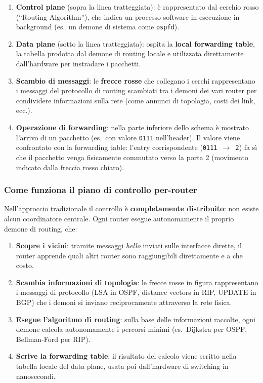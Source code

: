 \documentclass[a4paper,12pt]{report}
\begin{document}
\begin{enumerate}
    \item \textbf{Control plane} (sopra la linea tratteggiata): è rappresentato dal cerchio rosso (``Routing Algorithm''), che indica un processo software in esecuzione in background (es.\ un demone di sistema come \texttt{ospfd}).
    \item \textbf{Data plane} (sotto la linea tratteggiata): ospita la \textbf{local forwarding table}, la tabella prodotta dal demone di routing locale e utilizzata direttamente dall'hardware per instradare i pacchetti.
    \item \textbf{Scambio di messaggi}: le \textbf{frecce rosse} che collegano i cerchi rappresentano i messaggi del protocollo di routing scambiati tra i demoni dei vari router per condividere informazioni sulla rete (come annunci di topologia, costi dei link, ecc.).
    \item \textbf{Operazione di forwarding}: nella parte inferiore dello schema è mostrato l'arrivo di un pacchetto (es.\ con valore \texttt{0111} nell'header). Il valore viene confrontato con la forwarding table: l'entry corrispondente (\texttt{0111 $\to$ 2}) fa sì che il pacchetto venga fisicamente commutato verso la porta 2 (movimento indicato dalla freccia rosso chiaro).
\end{enumerate}

\newpage
\subsubsection*{Come funziona il piano di controllo per-router}

Nell'approccio tradizionale il controllo è \textbf{completamente distribuito}:
non esiste alcun coordinatore centrale. Ogni router esegue autonomamente il
proprio demone di routing, che:

\begin{enumerate}
    \item \textbf{Scopre i vicini}: tramite messaggi \textit{hello} inviati
          sulle interfacce dirette, il router apprende quali altri router
          sono raggiungibili direttamente e a che costo.
    \item \textbf{Scambia informazioni di topologia}: le frecce rosse in
          figura rappresentano i messaggi di protocollo (LSA in OSPF,
          distance vectors in RIP, UPDATE in BGP) che i demoni si
          inviano reciprocamente attraverso la rete fisica.
    \item \textbf{Esegue l'algoritmo di routing}: sulla base delle
          informazioni raccolte, ogni demone calcola autonomamente i
          percorsi minimi (es.\ Dijkstra per OSPF, Bellman-Ford per RIP).
    \item \textbf{Scrive la forwarding table}: il risultato del calcolo
          viene scritto nella tabella locale del data plane, usata poi
          dall'hardware di switching in nanosecondi.
\end{enumerate}
\end{document}
